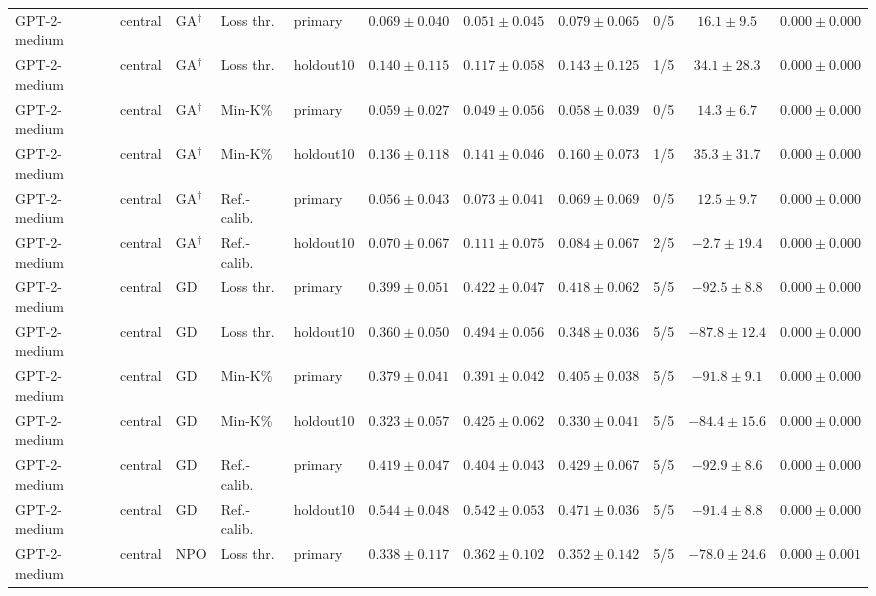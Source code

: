 \begin{table}[t]
\begin{tabular*}{\textwidth}{@{\extracolsep{\fill}}lllllcccccc@{}}
GPT-2-medium & central & GA$^{\dagger}$ & Loss thr. & primary & $0.069 \pm 0.040$ & $0.051 \pm 0.045$ & $0.079 \pm 0.065$ & 0/5 & $16.1 \pm 9.5$ & $0.000 \pm 0.000$ \\
GPT-2-medium & central & GA$^{\dagger}$ & Loss thr. & holdout10 & $0.140 \pm 0.115$ & $0.117 \pm 0.058$ & $0.143 \pm 0.125$ & 1/5 & $34.1 \pm 28.3$ & $0.000 \pm 0.000$ \\
GPT-2-medium & central & GA$^{\dagger}$ & Min-K\% & primary & $0.059 \pm 0.027$ & $0.049 \pm 0.056$ & $0.058 \pm 0.039$ & 0/5 & $14.3 \pm 6.7$ & $0.000 \pm 0.000$ \\
GPT-2-medium & central & GA$^{\dagger}$ & Min-K\% & holdout10 & $0.136 \pm 0.118$ & $0.141 \pm 0.046$ & $0.160 \pm 0.073$ & 1/5 & $35.3 \pm 31.7$ & $0.000 \pm 0.000$ \\
GPT-2-medium & central & GA$^{\dagger}$ & Ref.-calib. & primary & $0.056 \pm 0.043$ & $0.073 \pm 0.041$ & $0.069 \pm 0.069$ & 0/5 & $12.5 \pm 9.7$ & $0.000 \pm 0.000$ \\
GPT-2-medium & central & GA$^{\dagger}$ & Ref.-calib. & holdout10 & $0.070 \pm 0.067$ & $0.111 \pm 0.075$ & $0.084 \pm 0.067$ & 2/5 & $-2.7 \pm 19.4$ & $0.000 \pm 0.000$ \\
GPT-2-medium & central & GD & Loss thr. & primary & $0.399 \pm 0.051$ & $0.422 \pm 0.047$ & $0.418 \pm 0.062$ & 5/5 & $-92.5 \pm 8.8$ & $0.000 \pm 0.000$ \\
GPT-2-medium & central & GD & Loss thr. & holdout10 & $0.360 \pm 0.050$ & $0.494 \pm 0.056$ & $0.348 \pm 0.036$ & 5/5 & $-87.8 \pm 12.4$ & $0.000 \pm 0.000$ \\
GPT-2-medium & central & GD & Min-K\% & primary & $0.379 \pm 0.041$ & $0.391 \pm 0.042$ & $0.405 \pm 0.038$ & 5/5 & $-91.8 \pm 9.1$ & $0.000 \pm 0.000$ \\
GPT-2-medium & central & GD & Min-K\% & holdout10 & $0.323 \pm 0.057$ & $0.425 \pm 0.062$ & $0.330 \pm 0.041$ & 5/5 & $-84.4 \pm 15.6$ & $0.000 \pm 0.000$ \\
GPT-2-medium & central & GD & Ref.-calib. & primary & $0.419 \pm 0.047$ & $0.404 \pm 0.043$ & $0.429 \pm 0.067$ & 5/5 & $-92.9 \pm 8.6$ & $0.000 \pm 0.000$ \\
GPT-2-medium & central & GD & Ref.-calib. & holdout10 & $0.544 \pm 0.048$ & $0.542 \pm 0.053$ & $0.471 \pm 0.036$ & 5/5 & $-91.4 \pm 8.8$ & $0.000 \pm 0.000$ \\
GPT-2-medium & central & NPO & Loss thr. & primary & $0.338 \pm 0.117$ & $0.362 \pm 0.102$ & $0.352 \pm 0.142$ & 5/5 & $-78.0 \pm 24.6$ & $0.000 \pm 0.001$ \\

\end{tabular*}
\end{table}
